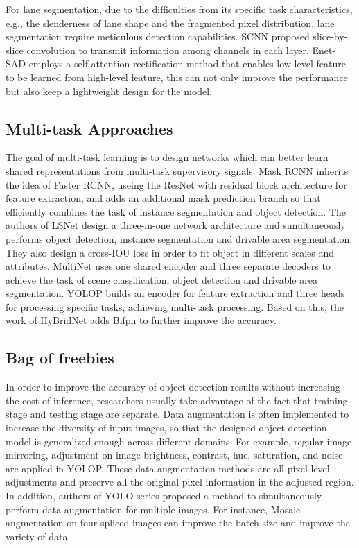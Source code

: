 \documentclass[10pt,twocolumn,letterpaper]{article}
\begin{document}
For lane segmentation, due to the difficulties from its specific task characteristics, e.g., the slenderness of lane shape and the fragmented pixel distribution, lane segmentation require meticulous detection capabilities. SCNN\cite{parashar2017scnn} proposed slice-by-slice convolution to transmit information among channels in each layer. Enet-SAD employs a self-attention rectification method that enables low-level feature to be learned from high-level feature, this can not only improve the performance but also keep a lightweight design for the model.

\subsection{Multi-task Approaches}
The goal of multi-task learning is to design networks which can better learn shared representations from multi-task supervisory signals. Mask RCNN inherits the idea of Faster RCNN, useing the ResNet with residual block\cite{he2016deep} architecture for feature extraction, and adds an additional mask prediction branch so that efficiently combines the task of instance segmentation and object detection. The authors of LSNet\cite{duan2021location} design a three-in-one network architecture and simultaneously performs object detection, instance segmentation and drivable area segmentation. They also design a cross-IOU loss in order to fit object in different scales and attributes. MultiNet uses one shared encoder and three separate decoders to achieve the task of scene classification, object detection and drivable area segmentation. YOLOP builds an encoder for feature extraction and three heads for processing specific tasks, achieving multi-task processing. Based on this, the work of HyBridNet adds Bifpn to further improve the accuracy.

\subsection{Bag of freebies}
In order to improve the accuracy of object detection results without increasing the cost of inference, researchers usually take advantage of the fact that training stage and testing stage are separate. Data augmentation is often implemented to increase the diversity of input images, so that the designed object detection model is generalized enough across different domains. For example, regular image mirroring, adjustment on image brightness, contrast, hue, saturation, and noise are applied in YOLOP. These data augmentation methods are all pixel-level adjustments and preserve all the original pixel information in the adjusted region. In addition, authors of YOLO series proposed a method to simultaneously perform data augmentation for multiple images. For instance, Mosaic augmentation \cite{hao2020improved} on four spliced images can improve the batch size and improve the variety of data.
\end{document}
